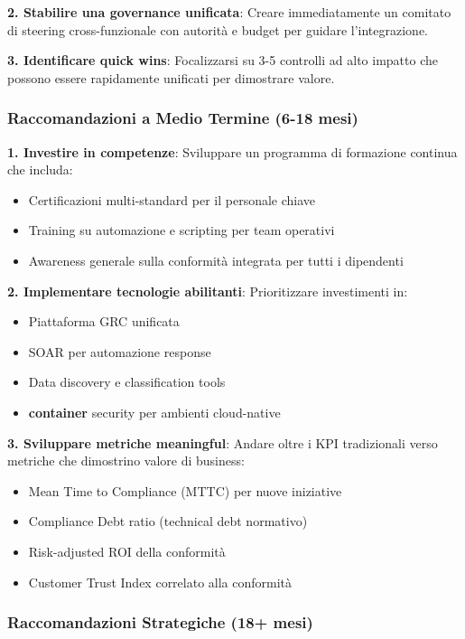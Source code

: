 \textbf{2. Stabilire una governance unificata}:
Creare immediatamente un comitato di steering cross-funzionale con autorità e budget per guidare l'integrazione.

\textbf{3. Identificare quick wins}:
Focalizzarsi su 3-5 controlli ad alto impatto che possono essere rapidamente unificati per dimostrare valore.

\subsubsection{Raccomandazioni a Medio Termine (6-18 mesi)}

\textbf{1. Investire in competenze}:
Sviluppare un programma di formazione continua che includa:
\begin{itemize}
    \item Certificazioni multi-standard per il personale chiave
    \item Training su automazione e scripting per team operativi
    \item Awareness generale sulla conformità integrata per tutti i dipendenti
\end{itemize}

\textbf{2. Implementare tecnologie abilitanti}:
Prioritizzare investimenti in:
\begin{itemize}
    \item Piattaforma GRC unificata
    \item SOAR per automazione response
    \item Data discovery e classification tools
    \item \textbf{\gls{container}} security per ambienti cloud-native
\end{itemize}

\textbf{3. Sviluppare metriche meaningful}:
Andare oltre i KPI tradizionali verso metriche che dimostrino valore di business:
\begin{itemize}
    \item Mean Time to Compliance (MTTC) per nuove iniziative
    \item Compliance Debt ratio (technical debt normativo)
    \item Risk-adjusted ROI della conformità
    \item Customer Trust Index correlato alla conformità
\end{itemize}

\subsubsection{Raccomandazioni Strategiche (18+ mesi)}

